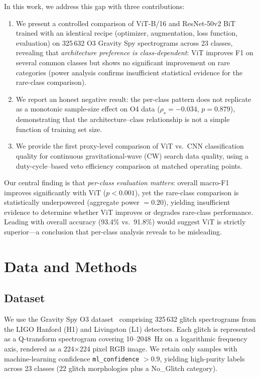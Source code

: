 \documentclass[12pt]{article}
\newcommand{\Ntotal}{325\,632}
\newcommand{\Nclasses}{23}
\newcommand{\vitAccuracy}{93.4\%}
\newcommand{\cnnAccuracy}{91.8\%}
\newcommand{\spearmanRhoOfour}{-0.034}
\newcommand{\spearmanPOfour}{0.879}
\begin{document}
In this work, we address this gap with three contributions:
\begin{enumerate}
  \item We present a controlled comparison of ViT-B/16 and ResNet-50v2 BiT
    trained with an identical recipe (optimizer, augmentation, loss function,
    evaluation) on \Ntotal{} O3 Gravity Spy spectrograms across \Nclasses{}
    classes, revealing that \emph{architecture preference is
    class-dependent}: ViT improves F1 on several common classes but shows
    no significant improvement on rare categories (power analysis confirms
    insufficient statistical evidence for the rare-class comparison).
  \item We report an honest negative result: the per-class pattern does not
    replicate as a monotonic sample-size effect on O4 data
    ($\rho_s = \spearmanRhoOfour$, $p = \spearmanPOfour$), demonstrating that
    the architecture--class relationship is not a simple function of training
    set size.
  \item We provide
    the first proxy-level comparison of ViT vs.\ CNN
    classification quality for continuous gravitational-wave (CW) search data
    quality, using a duty-cycle--based veto efficiency comparison at matched
    operating points.
\end{enumerate}
Our central finding is that \emph{per-class evaluation matters}: overall
macro-F1 improves significantly with ViT ($p < 0.001$), yet the rare-class
comparison is statistically underpowered (aggregate power $= 0.20$), yielding
insufficient evidence to determine whether ViT improves or degrades
rare-class performance.
Leading with overall accuracy (\vitAccuracy{} vs.\ \cnnAccuracy) would suggest
ViT is strictly superior---a conclusion that per-class analysis reveals to be
misleading.


\section{Data and Methods}
\label{sec:methods}

\subsection{Dataset}
\label{sec:dataset}

We use the Gravity Spy O3 dataset~\citep{Zevin2017, GravitySpyZenodo}
comprising \Ntotal{} glitch spectrograms from the LIGO Hanford (H1) and
Livingston (L1) detectors.
Each glitch is represented as a Q-transform spectrogram covering
10--2048~Hz on a logarithmic frequency axis, rendered as a 224$\times$224
pixel RGB image.
We retain only samples with machine-learning confidence
\texttt{ml\_confidence} $> 0.9$, yielding high-purity labels across
\Nclasses{} classes (22 glitch morphologies plus a No\_Glitch category).
\end{document}
